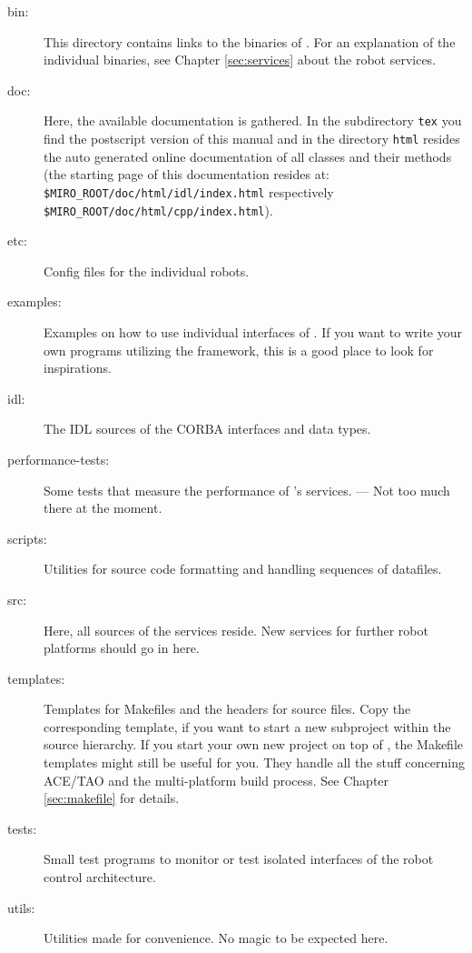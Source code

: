 \documentclass[10pt]{book}
\begin{document}
\begin{description}
\item[bin:]
  This directory contains links to the binaries of \miro.
  For an explanation of the individual binaries, see Chapter
  \ref{sec:services} about the robot services.
\item[doc:]
  Here, the available documentation is gathered. In the
  subdirectory {\tt tex} you find the postscript version of this
  manual and in the directory {\tt html} resides the auto generated
  online documentation of all \miro classes and their methods
  (the starting page of this documentation resides at: \\
  {\tt \$MIRO\_ROOT/doc/html/idl/index.html} respectively \\
  {\tt \$MIRO\_ROOT/doc/html/cpp/index.html}).
\item[etc:]
  Config files for the individual robots.
\item[examples:]
  Examples on how to use individual interfaces of \miro. If you want
  to write your own programs utilizing the \miro framework, this is a
  good place to look for inspirations.
\item[idl:]
  The IDL sources of the CORBA interfaces and data types.
\item[performance-tests:]
  Some tests that measure the performance of \miro's
  services. --- Not too much there at the moment.
\item[scripts:]
  Utilities for source code formatting and handling sequences of
  datafiles.
\item[src:]
  Here, all sources of the \miro services reside. New services for
  further robot platforms should go in here.
\item[templates:]
  Templates for Makefiles and the headers for source files. Copy the
  corresponding template, if you want to start a new subproject within
  the \miro source hierarchy. If you start your own new project on top
  of \miro, the Makefile templates might still be useful for you. They
  handle all the stuff concerning ACE/TAO and the multi-platform build
  process. See Chapter \ref{sec:makefile} for details.
\item[tests:]
  Small test programs to monitor or test isolated interfaces of the
  \miro robot control architecture.
\item[utils:]
  Utilities made for convenience. No magic to be expected here.
\end{description}












\begin{appendix}

\end{appendix}



\printindex
\end{document}
